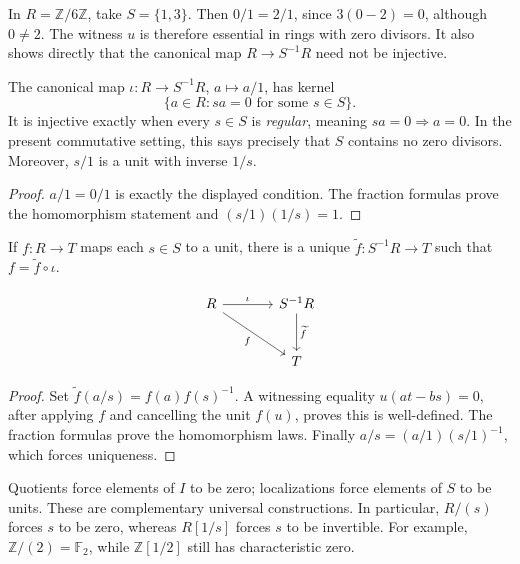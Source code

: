 \begin{example}
In \(R=\mathbb Z/6\mathbb Z\), take \(S=\{1,3\}\). Then
\(0/1=2/1\), since \(3(0-2)=0\), although \(0\ne2\). The witness \(u\) is
therefore essential in rings with zero divisors.  It also shows directly that
the canonical map \(R\to S^{-1}R\) need not be injective.
\end{example}
\begin{proposition}
The canonical map \(\iota:R\to S^{-1}R\), \(a\mapsto a/1\), has kernel
\[\{a\in R:sa=0\text{ for some }s\in S\}.\]
It is injective exactly when every \(s\in S\) is \emph{regular}, meaning
\(sa=0\Rightarrow a=0\).  In the present commutative setting, this says
precisely that \(S\) contains no zero divisors.  Moreover, \(s/1\) is a unit
with inverse \(1/s\).
\end{proposition}
\begin{proof}
\(a/1=0/1\) is exactly the displayed condition. The fraction formulas
prove the homomorphism statement and \((s/1)(1/s)=1\).
\end{proof}
\begin{theorem}
If \(f:R\to T\) maps each \(s\in S\) to a unit, there is a unique
\(\widetilde f:S^{-1}R\to T\) such that \(f=\widetilde f\circ\iota\).
\end{theorem}
\[
\begin{tikzcd}[column sep=large, row sep=large]
R \arrow[r, "\iota"] \arrow[dr, "f"'] & S^{-1}R \arrow[d, "\widetilde f"] \\
& T
\end{tikzcd}
\]
\begin{proof}
Set \(\widetilde f(a/s)=f(a)f(s)^{-1}\). A witnessing equality
\(u(at-bs)=0\), after applying \(f\) and cancelling the unit \(f(u)\),
proves this is well-defined. The fraction formulas prove the homomorphism
laws. Finally \(a/s=(a/1)(s/1)^{-1}\), which forces uniqueness.
\end{proof}
Quotients force elements of \(I\) to be zero; localizations force elements
of \(S\) to be units. These are complementary universal constructions.  In
particular, \(R/(s)\) forces \(s\) to be zero, whereas \(R[1/s]\) forces
\(s\) to be invertible.  For example,
\(\mathbb Z/(2)=\mathbb F_2\), while \(\mathbb Z[1/2]\) still has
characteristic zero.

